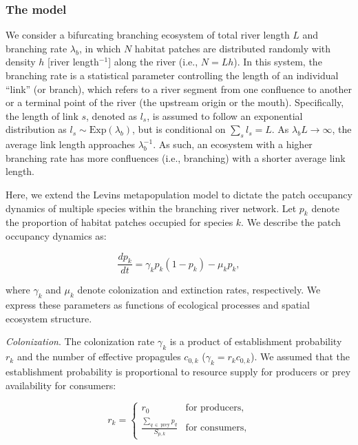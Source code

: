 \documentclass[11pt, class=article, crop=false]{standalone}
\begin{document}
\subsubsection{The model}

We consider a bifurcating branching ecosystem of total river length $L$ and branching rate $\lambda_b$, in which $N$ habitat patches are distributed randomly with density $h$ [river length$^{-1}$] along the river (i.e., $N = Lh$).
In this system, the branching rate is a statistical parameter controlling the length of an individual ``link'' (or branch), which refers to a river segment from one confluence to another or a terminal point of the river (the upstream origin or the mouth).
Specifically, the length of link $s$, denoted as $l_s$, is assumed to follow an exponential distribution as $l_s \sim \mbox{Exp}(\lambda_b)$, but is conditional on $\sum_s l_s = L$.
As $\lambda_b L \rightarrow \infty$, the average link length approaches $\lambda_b^{-1}$.
As such, an ecosystem with a higher branching rate has more confluences (i.e., branching) with a shorter average link length.

Here, we extend the Levins metapopulation model to dictate the patch occupancy dynamics of multiple species within the branching river network.
Let $p_k$ denote the proportion of habitat patches occupied for species $k$.
We describe the patch occupancy dynamics as:

\begin{equation}
    \frac{dp_k}{dt} = \gamma_{k} p_k (1 - p_k) - \mu_k p_k,
\end{equation}

where $\gamma_k$ and $\mu_k$ denote colonization and extinction rates, respectively.
We express these parameters as functions of ecological processes and spatial ecosystem structure.

\textit{Colonization}. The colonization rate $\gamma_k$ is a product of establishment probability $r_k$ and the number of effective propagules $c_{0,k}$ ($\gamma_k = r_k c_{0,k}$).
We assumed that the establishment probability is proportional to resource supply for producers or prey availability for consumers:

\begin{equation}
    r_{k} = 
    \begin{cases}
        r_0 & \text{for producers,}\\
        \frac{\sum_{q~\in~\text{prey}} p_{q}}{S_{p,k}} & \text{for consumers,}
    \end{cases}
\end{equation}
\end{document}
